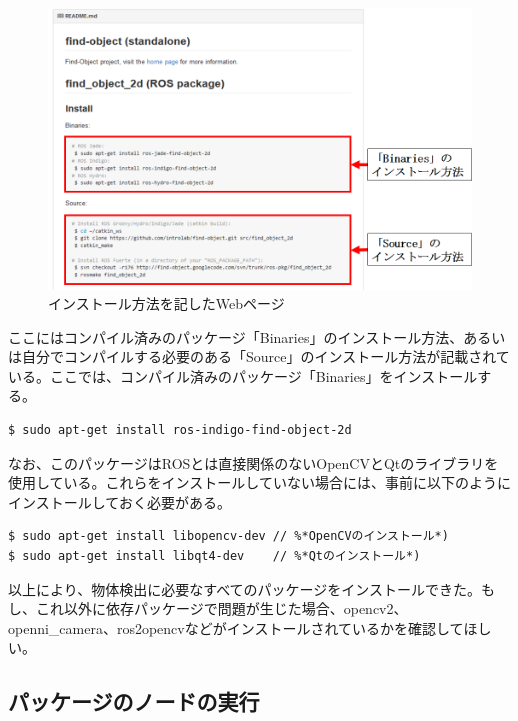 \begin{figure}[htp]
  \centering
  \includegraphics[width=15cm]{pictures/chapter7/pic_07_08.png}
  \caption{インストール方法を記したWebページ}
\end{figure}

ここにはコンパイル済みのパッケージ「Binaries」のインストール方法、あるいは自分でコンパイルする必要のある「Source」のインストール方法が記載されている。ここでは、コンパイル済みのパッケージ「Binaries」をインストールする。

\begin{lstlisting}[language=ROS]
$ sudo apt-get install ros-indigo-find-object-2d
\end{lstlisting}

なお、このパッケージはROSとは直接関係のないOpenCVとQtのライブラリを使用している。これらをインストールしていない場合には、事前に以下のようにインストールしておく必要がある。

\begin{lstlisting}[language=ROS]
$ sudo apt-get install libopencv-dev // %*OpenCVのインストール*)
$ sudo apt-get install libqt4-dev    // %*Qtのインストール*)
\end{lstlisting}

以上により、物体検出に必要なすべてのパッケージをインストールできた。もし、これ以外に依存パッケージで問題が生じた場合、opencv2、openni\_camera、ros2opencvなどがインストールされているかを確認してほしい。

\subsection{パッケージのノードの実行}

